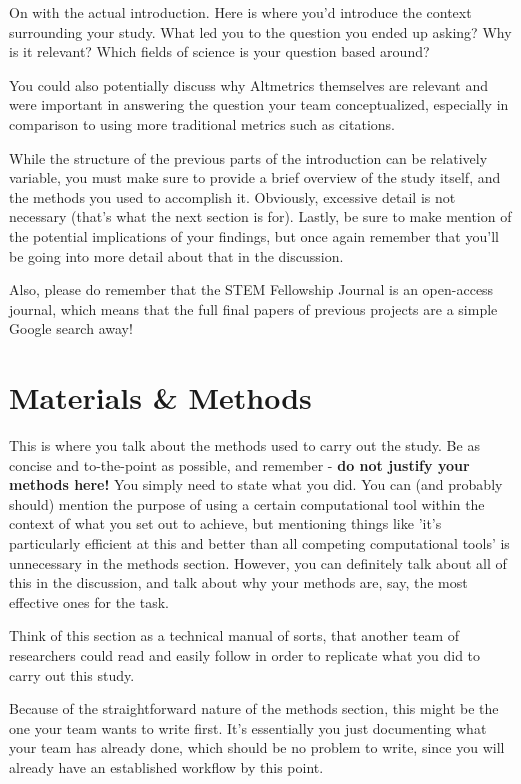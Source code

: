\documentclass[10pt,twocolumn,letterpaper]{article}
\begin{document}
On with the actual introduction. Here is where you'd introduce the context surrounding your study. What led you to the question you ended up asking? Why is it relevant? Which fields of science is your question based around?

You could also potentially discuss why Altmetrics themselves are relevant and were important in answering the question your team conceptualized, especially in comparison to using more traditional metrics such as citations.

While the structure of the previous parts of the introduction can be relatively variable, you must make sure to provide a brief overview of the study itself, and the methods you used to accomplish it. Obviously, excessive detail is not necessary (that's what the next section is for). Lastly, be sure to make mention of the potential implications of your findings, but once again remember that you'll be going into more detail about that in the discussion.

Also, please do remember that the STEM Fellowship Journal is an open-access journal, which means that the full final papers of previous projects are a simple Google search away!

\section{Materials \& Methods}

This is where you talk about the methods used to carry out the study. Be as concise and to-the-point as possible, and remember - \textbf{do not justify your methods here!} You simply need to state what you did. You can (and probably should) mention the purpose of using a certain computational tool within the context of what you set out to achieve, but mentioning things like 'it's particularly efficient at this and better than all competing computational tools' is unnecessary in the methods section. However, you can definitely talk about all of this in the discussion, and talk about why your methods are, say, the most effective ones for the task.

Think of this section as a technical manual of sorts, that another team of researchers could read and easily follow in order to replicate what you did to carry out this study.

Because of the straightforward nature of the methods section, this might be the one your team wants to write first. It's essentially you just documenting what your team has already done, which should be no problem to write, since you will already have an established workflow by this point.
\end{document}
